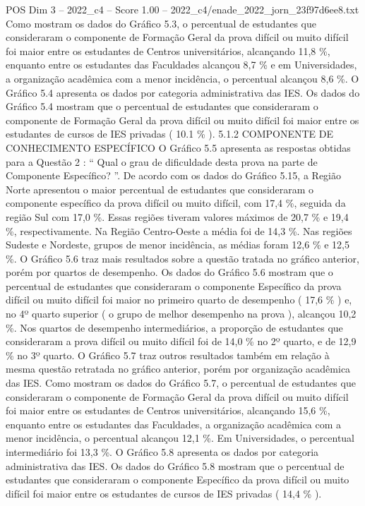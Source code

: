 \begin{textsample}{POS Dim 3 – 2022\_c4 – Score 1.00 – 2022\_c4/enade\_2022\_jorn\_23f97d6ee8.txt}
Como mostram os dados do Gráfico 5.3, o percentual de estudantes que consideraram o componente de Formação Geral da prova difícil ou muito difícil foi maior entre os estudantes de Centros universitários, alcançando 11,8 \%, enquanto entre os estudantes das Faculdades alcançou 8,7 \% e em Universidades, a organização acadêmica com a menor incidência, o percentual alcançou 8,6 \%.
O Gráfico 5.4 apresenta os dados por categoria administrativa das IES.
Os dados do Gráfico 5.4 mostram que o percentual de estudantes que consideraram o componente de Formação Geral da prova difícil ou muito difícil foi maior entre os estudantes de cursos de IES privadas ( 10.1 \% ). 5.1.2 COMPONENTE DE CONHECIMENTO ESPECÍFICO O Gráfico 5.5 apresenta as respostas obtidas para a Questão 2 : “ Qual o grau de dificuldade desta prova na parte de Componente Específico? ”.
De acordo com os dados do Gráfico 5.15, a Região Norte apresentou o maior percentual de estudantes que consideraram o componente específico da prova difícil ou muito difícil, com 17,4 \%, seguida da região Sul com 17,0 \%.
Essas regiões tiveram valores máximos de 20,7 \% e 19,4 \%, respectivamente.
Na Região Centro-Oeste a média foi de 14,3 \%.
Nas regiões Sudeste e Nordeste, grupos de menor incidência, as médias foram 12,6 \% e 12,5 \%.
O Gráfico 5.6 traz mais resultados sobre a questão tratada no gráfico anterior, porém por quartos de desempenho.
Os dados do Gráfico 5.6 mostram que o percentual de estudantes que consideraram o componente Específico da prova difícil ou muito difícil foi maior no primeiro quarto de desempenho ( 17,6 \% ) e, no 4º quarto superior ( o grupo de melhor desempenho na prova ), alcançou 10,2 \%.
Nos quartos de desempenho intermediários, a proporção de estudantes que consideraram a prova difícil ou muito difícil foi de 14,0 \% no 2º quarto, e de 12,9 \% no 3º quarto.
O Gráfico 5.7 traz outros resultados também em relação à mesma questão retratada no gráfico anterior, porém por organização acadêmica das IES.
Como mostram os dados do Gráfico 5.7, o percentual de estudantes que consideraram o componente de Formação Geral da prova difícil ou muito difícil foi maior entre os estudantes de Centros universitários, alcançando 15,6 \%, enquanto entre os estudantes das Faculdades, a organização acadêmica com a menor incidência, o percentual alcançou 12,1 \%.
Em Universidades, o percentual intermediário foi 13,3 \%.
O Gráfico 5.8 apresenta os dados por categoria administrativa das IES.
Os dados do Gráfico 5.8 mostram que o percentual de estudantes que consideraram o componente Específico da prova difícil ou muito difícil foi maior entre os estudantes de cursos de IES privadas ( 14,4 \% ).

\end{textsample}
